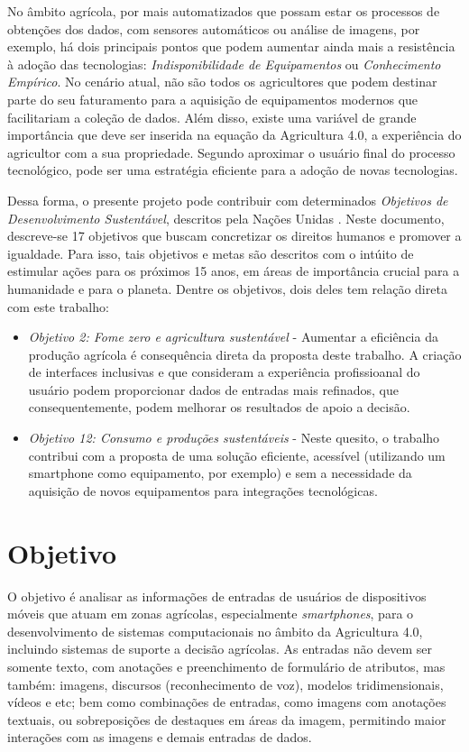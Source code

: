 \documentclass[12pt]{article}
\begin{document}
No âmbito agrícola, por mais automatizados que possam estar os processos de obtenções dos dados, com sensores automáticos ou análise de imagens, por exemplo, há dois principais pontos que podem aumentar ainda mais a resistência à adoção das tecnologias: \textit{Indisponibilidade de Equipamentos} ou \textit{Conhecimento Empírico}. No cenário atual, não são todos os agricultores que podem destinar parte do seu faturamento para a aquisição de equipamentos modernos que facilitariam a coleção de dados. Além disso, existe uma variável de grande importância que deve ser inserida na equação da Agricultura 4.0, a experiência do agricultor com a sua propriedade. Segundo \cite{agriculture-40-rose} aproximar o usuário final do processo tecnológico, pode ser uma estratégia eficiente para a adoção de novas tecnologias.

Dessa forma, o presente projeto pode contribuir com determinados \textit{Objetivos de Desenvolvimento Sustentável}, descritos pela Nações Unidas \cite{UN:2020}. Neste documento, descreve-se 17 objetivos que buscam concretizar os direitos humanos e promover a igualdade. Para isso, tais objetivos e metas são descritos com o intúito de estimular ações para os próximos 15 anos, em áreas de importância crucial para a humanidade e para o planeta. Dentre os objetivos, dois deles tem relação direta com este trabalho:

\begin{itemize}
	\item \textit{Objetivo 2: Fome zero e agricultura sustentável} - Aumentar a eficiência da produção agrícola é consequência direta da proposta deste trabalho. A criação de interfaces inclusivas e que consideram a experiência profissioanal do usuário podem proporcionar dados de entradas mais refinados, que consequentemente, podem melhorar os resultados de apoio a decisão.
	\item \textit{Objetivo 12: Consumo e produções sustentáveis} - Neste quesito, o trabalho contribui com a proposta de uma solução eficiente, acessível (utilizando um smartphone como equipamento, por exemplo) e sem a necessidade da aquisição de novos equipamentos para integrações tecnológicas.
\end{itemize}

\section{Objetivo}

O objetivo é analisar as informações de entradas de usuários de dispositivos móveis que atuam em zonas agrícolas, especialmente \textit{smartphones}, para o desenvolvimento de sistemas computacionais no âmbito da Agricultura 4.0, incluindo sistemas de suporte a decisão agrícolas. As entradas não devem ser somente texto, com anotações e preenchimento de formulário de atributos, mas também: imagens, discursos (reconhecimento de voz), modelos tridimensionais, vídeos e etc; bem como combinações de entradas, como imagens com anotações textuais, ou sobreposições de destaques em áreas da imagem, permitindo maior interações com as imagens e demais entradas de dados.
\end{document}
